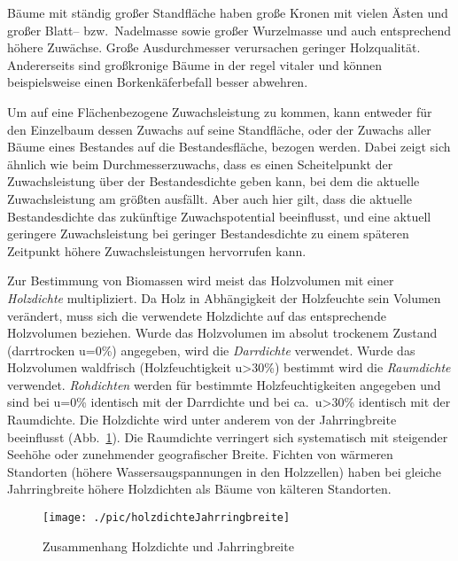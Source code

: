 \documentclass[twocolumn]{scrartcl}
\begin{document}
Bäume mit ständig großer Standfläche haben große Kronen mit vielen Ästen und
großer Blatt-- bzw.\ Nadelmasse sowie großer Wurzelmasse und auch entsprechend
höhere Zuwächse. Große Ausdurchmesser verursachen geringer Holzqualität.
Andererseits sind großkronige Bäume in der regel vitaler und können
beispielsweise einen Borkenkäferbefall besser abwehren.

Um auf eine Flächenbezogene Zuwachsleistung zu kommen, kann entweder für den
Einzelbaum dessen Zuwachs auf seine Standfläche, oder der Zuwachs aller Bäume
eines Bestandes auf die Bestandesfläche, bezogen werden. Dabei zeigt sich
ähnlich wie beim Durchmesserzuwachs, dass es einen Scheitelpunkt der
Zuwachsleistung über der Bestandesdichte geben kann, bei dem die aktuelle
Zuwachsleistung am größten ausfällt. Aber auch hier gilt, dass die aktuelle
Bestandesdichte das zukünftige Zuwachspotential beeinflusst, und eine aktuell
geringere Zuwachsleistung bei geringer Bestandesdichte zu einem späteren
Zeitpunkt höhere Zuwachsleistungen hervorrufen kann.

Zur Bestimmung von Biomassen wird meist das Holzvolumen mit einer
\emph{Holzdichte} multipliziert. Da Holz in Abhängigkeit der
Holzfeuchte sein Volumen verändert, muss sich die verwendete Holzdichte auf das
entsprechende Holzvolumen beziehen. Wurde das Holzvolumen im absolut trockenem
Zustand (darrtrocken u=0\%) angegeben, wird die
\emph{Darrdichte}
verwendet. Wurde das Holzvolumen waldfrisch (Holzfeuchtigkeit u>30\%) bestimmt
wird die
\emph{Raumdichte}
verwendet.
\emph{Rohdichten}
werden für bestimmte Holzfeuchtigkeiten angegeben und sind bei u=0\% identisch
mit der Darrdichte und bei ca.\ u>30\% identisch mit der Raumdichte. Die
Holzdichte wird unter anderem von der Jahrringbreite beeinflusst (Abb.\
\ref{fig:holzdichteJahrringbreite}). Die Raumdichte verringert sich systematisch
mit steigender Seehöhe oder zunehmender geografischer Breite. Fichten von
wärmeren Standorten (höhere Wassersaugspannungen in den Holzzellen) haben bei
gleiche Jahrringbreite höhere Holzdichten als Bäume von kälteren Standorten.

\begin{figure}[htbp]
  \centering
  \texttt{[image: ./pic/holzdichteJahrringbreite]}
  \caption{Zusammenhang Holzdichte und Jahrringbreite}
  \label{fig:holzdichteJahrringbreite}
\end{figure}
\end{document}
